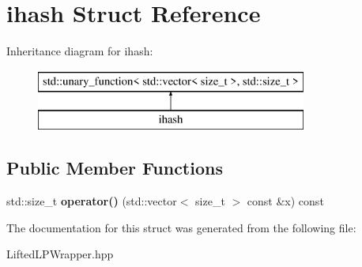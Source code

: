 \hypertarget{structihash}{\section{ihash Struct Reference}
\label{structihash}
}
Inheritance diagram for ihash\-:\begin{figure}[H]
\begin{center}
\leavevmode
\includegraphics[height=2.000000cm]{structihash}
\end{center}
\end{figure}
\subsection*{Public Member Functions}
\begin{DoxyCompactItemize}
\item 
\hypertarget{structihash_aee085581d64eaa4ffb8547512d1da2fc}{std\-::size\-\_\-t {\bfseries operator()} (std\-::vector$<$ size\-\_\-t $>$ const \&x) const }\label{structihash_aee085581d64eaa4ffb8547512d1da2fc}

\end{DoxyCompactItemize}


The documentation for this struct was generated from the following file\-:\begin{DoxyCompactItemize}
\item 
Lifted\-L\-P\-Wrapper.\-hpp\end{DoxyCompactItemize}
